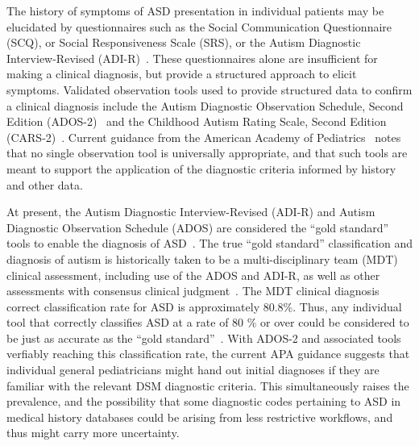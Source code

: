 \documentclass[3p,super,numbers,sort&compress,preprint,10pt]{elsarticle}
\begin{document}





The history of symptoms of  ASD presentation in individual patients may be elucidated by questionnaires such as
the Social Communication Questionnaire (SCQ), or Social Responsiveness
Scale (SRS), or the Autism Diagnostic Interview-Revised (ADI-R)~\cite{hyman2020identification}. These questionnaires alone are insufficient for making a clinical diagnosis, but provide a structured approach to
elicit symptoms. Validated observation tools used to provide structured data to confirm a clinical diagnosis include the Autism Diagnostic Observation Schedule,
Second Edition (ADOS-2)~\cite{esler2015autism} and the
Childhood Autism Rating Scale,
Second Edition (CARS-2)~\cite{chlebowski2010using}. Current guidance from the American Academy of Pediatrics~\cite{hyman2020identification}   notes that no single
observation tool is universally appropriate,
and that such tools are meant to support the application of the diagnostic criteria informed by history
and other data.

At present, the Autism Diagnostic Interview-Revised (ADI-R) and Autism Diagnostic Observation
Schedule (ADOS) are considered the ``gold
standard'' tools to enable the  diagnosis of ASD~\cite{falkmer2013diagnostic}. 
The true  ``gold standard'' classification and diagnosis of autism is historically taken to be a multi-disciplinary team (MDT) clinical assessment, including use of the ADOS and
ADI-R, as well as other assessments with consensus clinical judgment~\cite{falkmer2013diagnostic}.  
The MDT clinical diagnosis correct classification rate for ASD is approximately 80.8\%. Thus, any individual tool that correctly classifies ASD at a rate of 80 \% or over could be considered to be just as accurate as the ``gold standard''~\cite{falkmer2013diagnostic}. With ADOS-2 and associated tools verfiably  reaching this classification rate, the current APA guidance suggests that individual general pediatricians might hand out initial diagnoses if they are familiar with the relevant DSM diagnostic criteria. This simultaneously raises the prevalence, and  the possibility that  some diagnostic codes pertaining to ASD in medical history databases could be arising from less restrictive workflows, and thus might carry more uncertainty.
\end{document}
